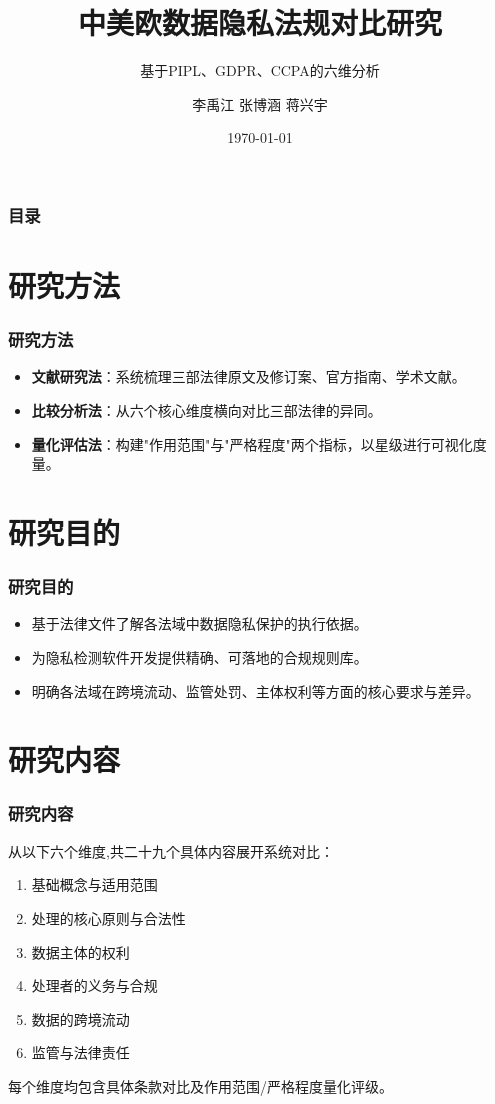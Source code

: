 \documentclass[AutoFakeBold,AutoFakeSlant]{beamer}
\author{李禹江 张博涵 蒋兴宇}
\title{中美欧数据隐私法规对比研究}
\subtitle{基于PIPL、GDPR、CCPA的六维分析}
\institute{我的刀盾队}
\date{\today}
\begin{document}
\kaishu

\begin{frame}
    \titlepage
\end{frame}

\begin{frame}
	\frametitle{目录}
	\tableofcontents
\end{frame}

\section{研究方法}
\begin{frame}
	\frametitle{研究方法}
	\begin{itemize}
		\item \textbf{文献研究法}：系统梳理三部法律原文及修订案、官方指南、学术文献。
		\item \textbf{比较分析法}：从六个核心维度横向对比三部法律的异同。
		\item \textbf{量化评估法}：构建"作用范围"与"严格程度"两个指标，以星级进行可视化度量。
	\end{itemize}
\end{frame}

\section{研究目的}
\begin{frame}
	\frametitle{研究目的}
	\begin{itemize}
		\item 基于法律文件了解各法域中数据隐私保护的执行依据。
		\item 为隐私检测软件开发提供精确、可落地的合规规则库。
		\item 明确各法域在跨境流动、监管处罚、主体权利等方面的核心要求与差异。
	\end{itemize}
\end{frame}

\section{研究内容}
\begin{frame}
	\frametitle{研究内容}
	从以下六个维度,共二十九个具体内容展开系统对比：
	\begin{enumerate}
		\item 基础概念与适用范围
		\item 处理的核心原则与合法性
		\item 数据主体的权利
		\item 处理者的义务与合规
		\item 数据的跨境流动
		\item 监管与法律责任
	\end{enumerate}
	每个维度均包含具体条款对比及作用范围/严格程度量化评级。
\end{frame}
\end{document}
